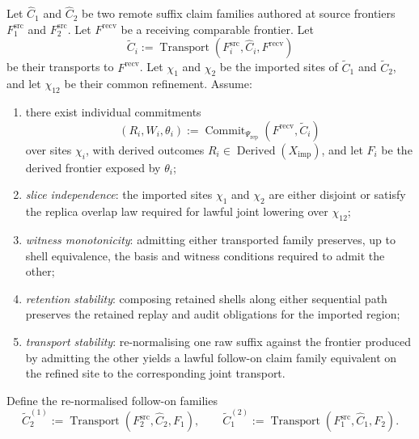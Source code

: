 \documentclass{aion}
\begin{document}
\begin{theorem}
\label{thm:derived-independent-suffix-confluence}
	Let \(\widehat{C}_1\) and \(\widehat{C}_2\) be two remote suffix claim
	families authored at source frontiers \(F^{\mathrm{src}}_1\) and
	\(F^{\mathrm{src}}_2\). Let \(F^{\mathrm{recv}}\) be a receiving comparable
	frontier. Let
	\[
		\widetilde{C}_i
		:=
		\operatorname{Transport}(F^{\mathrm{src}}_i, \widehat{C}_i, F^{\mathrm{recv}})
	\]
	be their transports to \(F^{\mathrm{recv}}\). Let \(\chi_1\) and \(\chi_2\)
	be the imported sites of \(\widetilde{C}_1\) and \(\widetilde{C}_2\), and let
	\(\chi_{12}\) be their common refinement. Assume:

	\begin{enumerate}[leftmargin=*]
		\item there exist individual commitments
		      \[
			      (R_i, W_i, \theta_i)
			      :=
			      \operatorname{Commit}_{\Psi_{\mathrm{rep}}}
			      (F^{\mathrm{recv}}, \widetilde{C}_i)
		      \]
		      over sites \(\chi_i\), with derived outcomes
		      \(R_i \in \operatorname{Derived}(X_{\mathrm{imp}})\), and let \(F_i\) be the
		      derived frontier exposed by \(\theta_i\);

		\item \emph{slice independence}: the imported sites \(\chi_1\) and
		      \(\chi_2\) are either disjoint or satisfy the replica overlap law required
		      for lawful joint lowering over \(\chi_{12}\);

		\item \emph{witness monotonicity}: admitting either transported family
		      preserves, up to shell equivalence, the basis and witness conditions required
		      to admit the other;

		\item \emph{retention stability}: composing retained shells along either
		      sequential path preserves the retained replay and audit obligations for the
		      imported region;

		\item \emph{transport stability}: re-normalising one raw suffix against the
		      frontier produced by admitting the other yields a lawful follow-on claim
		      family equivalent on the refined site to the corresponding joint transport.
	\end{enumerate}

	Define the re-normalised follow-on families
	\[
		\widetilde{C}_2^{(1)}
		:=
		\operatorname{Transport}(F^{\mathrm{src}}_2, \widehat{C}_2, F_1),
		\qquad
		\widetilde{C}_1^{(2)}
		:=
		\operatorname{Transport}(F^{\mathrm{src}}_1, \widehat{C}_1, F_2).
	\]


\end{theorem}
\end{document}
